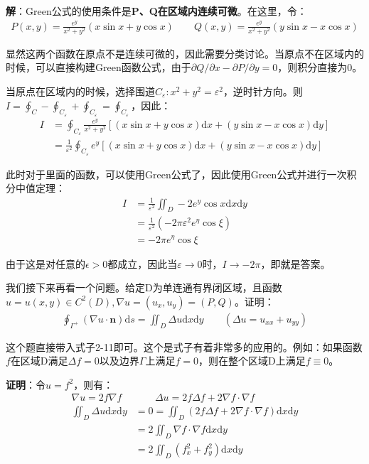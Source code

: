 \documentclass{ctexart}
\let\oldtextbf\textbf
\renewcommand{\textbf}[1]{\textcolor{brown!50!red}{\oldtextbf{#1}}}
\begin{document}
\textbf{\color{brown!50!red}解}：Green公式的使用条件是\textbf{\color{brown!50!red}P、Q在区域内连续可微}。在这里，令：
\begin{align*}
P(x,y)=\frac{e^y}{x^2+y^2}(x\sin x+y\cos x)\qquad Q(x,y)=\frac{e^y}{x^2+y^2}(y\sin x-x\cos x) 
\end{align*}

显然这两个函数在原点不是连续可微的，因此需要分类讨论。当原点不在区域内的时候，可以直接构建Green函数公式，由于$\partial{Q}/\partial{x}-\partial{P}/\partial{y}=0$，则积分直接为0。

当原点在区域内的时候，选择围道$C_\varepsilon:x^2+y^2=\varepsilon^2$，逆时针方向。则$I=\oint_C-\oint_{C_\varepsilon}+\oint_{C_\varepsilon}=\oint_{C_\varepsilon}$，因此：
\begin{align*}
I&= \oint_{C_\varepsilon}\frac{e^y}{x^2+y^2}[(x\sin x+y\cos x)\mathrm{d}x+(y\sin x-x\cos x)\mathrm{d}y]\\
&=\frac{1}{\varepsilon ^2} \oint_{C_\varepsilon}e^y[(x\sin x+y\cos x)\mathrm{d}x+(y\sin x-x\cos x)\mathrm{d}y]
\end{align*}

此时对于里面的函数，可以使用Green公式了，因此使用Green公式并进行一次积分中值定理：
\begin{align*}
I&=\frac{1}{\varepsilon ^2} \iint_{D}-2e^y\cos x\mathrm{d}x\mathrm{d}y\\
&=\frac{1}{\varepsilon ^2}(-2\pi \varepsilon ^2e^\eta\cos\xi)\\
&=-2\pi e^\eta\cos\xi 
\end{align*}

由于这是对任意的$\epsilon>0$都成立，因此当$\varepsilon\to 0$时，$I\to -2\pi$，即就是答案。

我们接下来再看一个问题。给定D为单连通有界闭区域，且函数$u=u(x,y)\in C^2(D),\nabla u=(u_x,u_y)=(P,Q)$。证明：
\begin{align*}
\oint_{\Gamma^+}(\nabla u\cdot \bm{n})\mathrm{d}s=\iint_D\Delta u\mathrm{d}x\mathrm{d}y   
\qquad (\Delta u=u_{xx}+u_{yy})\tag{2-12}
\end{align*}

这个题直接带入式子2-11即可。这个是式子有着非常多的应用的。例如：如果函数$f$在区域D满足$\Delta f=0$以及边界$\Gamma$上满足$f=0$，则在整个区域D上满足$f\equiv 0$。

\textbf{\color{brown!50!red}证明}：令$u=f^2$，则有：
\begin{align*}
\nabla u=2f\nabla f&\qquad\Delta u=2f\Delta f+2\nabla f\cdot\nabla f\\
\iint_D\Delta u\mathrm dx\mathrm{d}y&=0=\iint_D(2f\Delta  f +2\nabla f\cdot\nabla f)\mathrm dx\mathrm{d}y\\
&=2\iint_D\nabla f\cdot\nabla f \mathrm dx\mathrm{d}y\\
&=2\iint_D(f_{x}^2+f_{y}^2)\mathrm{d}x\mathrm{d}y
\end{align*}
\end{document}
